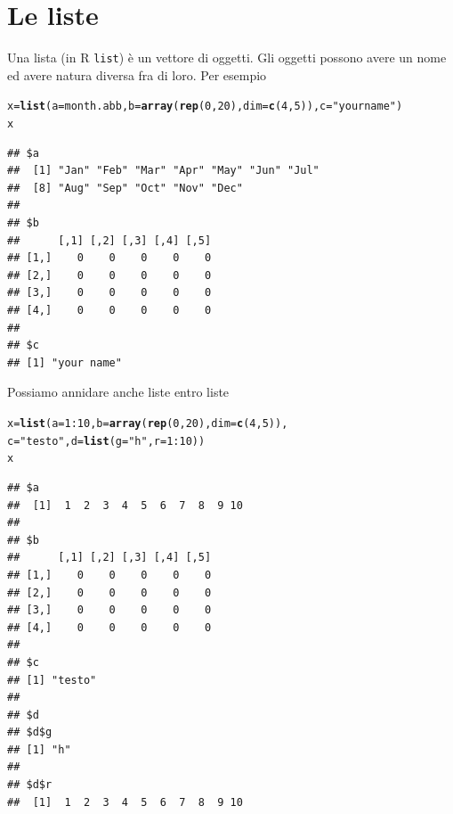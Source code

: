 \documentclass[onecolumn,12pt]{book}\usepackage[]{graphicx}\usepackage[]{color}
\makeatletter
\newcommand{\hlnum}[1]{\textcolor[rgb]{0.686,0.059,0.569}{#1}}%
\newcommand{\hlstr}[1]{\textcolor[rgb]{0.192,0.494,0.8}{#1}}%
\newcommand{\hlopt}[1]{\textcolor[rgb]{0,0,0}{#1}}%
\newcommand{\hlstd}[1]{\textcolor[rgb]{0.345,0.345,0.345}{#1}}%
\newcommand{\hlkwb}[1]{\textcolor[rgb]{0.69,0.353,0.396}{#1}}%
\newcommand{\hlkwc}[1]{\textcolor[rgb]{0.333,0.667,0.333}{#1}}%
\newcommand{\hlkwd}[1]{\textcolor[rgb]{0.737,0.353,0.396}{\textbf{#1}}}%
\newenvironment{kframe}{%
 \def\at@end@of@kframe{}%
 \ifinner\ifhmode%
  \def\at@end@of@kframe{\end{minipage}}%
  \begin{minipage}{\columnwidth}%
 \fi\fi%
 \def\FrameCommand##1{\hskip\@totalleftmargin \hskip-\fboxsep
 \colorbox{shadecolor}{##1}\hskip-\fboxsep
     \hskip-\linewidth \hskip-\@totalleftmargin \hskip\columnwidth}%
 \MakeFramed {\advance\hsize-\width
   \@totalleftmargin\z@ \linewidth\hsize
   \@setminipage}}%
 {\par\unskip\endMakeFramed%
 \at@end@of@kframe}
\newenvironment{knitrout}{}{} %
\makeatother
\begin{document}
\section{Le liste}
Una lista (in \textsf{R} \texttt{list}) \`e un vettore di oggetti.  Gli oggetti possono avere un nome ed avere natura diversa fra di loro. 
Per esempio
\begin{knitrout}
\color{fgcolor}\begin{kframe}
\begin{alltt}
\hlstd{x}\hlkwb{=}\hlkwd{list}\hlstd{(}\hlkwc{a}\hlstd{=month.abb ,} \hlkwc{b}\hlstd{=}\hlkwd{array}\hlstd{(}\hlkwd{rep}\hlstd{(}\hlnum{0}\hlstd{,}\hlnum{20}\hlstd{),} \hlkwc{dim}\hlstd{=}\hlkwd{c}\hlstd{(}\hlnum{4}\hlstd{,}\hlnum{5}\hlstd{)),}\hlkwc{c}\hlstd{=}\hlstr{"your name"}\hlstd{)}
\hlstd{x}
\end{alltt}
\begin{verbatim}
## $a
##  [1] "Jan" "Feb" "Mar" "Apr" "May" "Jun" "Jul"
##  [8] "Aug" "Sep" "Oct" "Nov" "Dec"
## 
## $b
##      [,1] [,2] [,3] [,4] [,5]
## [1,]    0    0    0    0    0
## [2,]    0    0    0    0    0
## [3,]    0    0    0    0    0
## [4,]    0    0    0    0    0
## 
## $c
## [1] "your name"
\end{verbatim}
\end{kframe}
\end{knitrout}
Possiamo annidare anche liste entro liste
\begin{knitrout}
\color{fgcolor}\begin{kframe}
\begin{alltt}
\hlstd{x}\hlkwb{=}\hlkwd{list}\hlstd{(}\hlkwc{a}\hlstd{=}\hlnum{1}\hlopt{:}\hlnum{10}\hlstd{,}\hlkwc{b}\hlstd{=}\hlkwd{array}\hlstd{(}\hlkwd{rep}\hlstd{(}\hlnum{0}\hlstd{,}\hlnum{20}\hlstd{),}\hlkwc{dim}\hlstd{=}\hlkwd{c}\hlstd{(}\hlnum{4}\hlstd{,}\hlnum{5}\hlstd{)),}
\hlkwc{c}\hlstd{=}\hlstr{"testo"}\hlstd{,}\hlkwc{d}\hlstd{=}\hlkwd{list}\hlstd{(}\hlkwc{g}\hlstd{=}\hlstr{"h"}\hlstd{,}\hlkwc{r}\hlstd{=}\hlnum{1}\hlopt{:}\hlnum{10}\hlstd{) )}
\hlstd{x}
\end{alltt}
\begin{verbatim}
## $a
##  [1]  1  2  3  4  5  6  7  8  9 10
## 
## $b
##      [,1] [,2] [,3] [,4] [,5]
## [1,]    0    0    0    0    0
## [2,]    0    0    0    0    0
## [3,]    0    0    0    0    0
## [4,]    0    0    0    0    0
## 
## $c
## [1] "testo"
## 
## $d
## $d$g
## [1] "h"
## 
## $d$r
##  [1]  1  2  3  4  5  6  7  8  9 10
\end{verbatim}
\end{kframe}
\end{knitrout}

 
\end{document}
